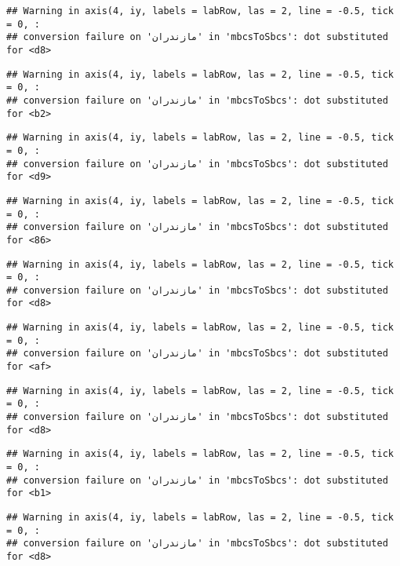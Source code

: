 \documentclass[
]{article}
\begin{document}
\begin{verbatim}
## Warning in axis(4, iy, labels = labRow, las = 2, line = -0.5, tick = 0, :
## conversion failure on 'مازندران' in 'mbcsToSbcs': dot substituted for <d8>
\end{verbatim}

\begin{verbatim}
## Warning in axis(4, iy, labels = labRow, las = 2, line = -0.5, tick = 0, :
## conversion failure on 'مازندران' in 'mbcsToSbcs': dot substituted for <b2>
\end{verbatim}

\begin{verbatim}
## Warning in axis(4, iy, labels = labRow, las = 2, line = -0.5, tick = 0, :
## conversion failure on 'مازندران' in 'mbcsToSbcs': dot substituted for <d9>
\end{verbatim}

\begin{verbatim}
## Warning in axis(4, iy, labels = labRow, las = 2, line = -0.5, tick = 0, :
## conversion failure on 'مازندران' in 'mbcsToSbcs': dot substituted for <86>
\end{verbatim}

\begin{verbatim}
## Warning in axis(4, iy, labels = labRow, las = 2, line = -0.5, tick = 0, :
## conversion failure on 'مازندران' in 'mbcsToSbcs': dot substituted for <d8>
\end{verbatim}

\begin{verbatim}
## Warning in axis(4, iy, labels = labRow, las = 2, line = -0.5, tick = 0, :
## conversion failure on 'مازندران' in 'mbcsToSbcs': dot substituted for <af>
\end{verbatim}

\begin{verbatim}
## Warning in axis(4, iy, labels = labRow, las = 2, line = -0.5, tick = 0, :
## conversion failure on 'مازندران' in 'mbcsToSbcs': dot substituted for <d8>
\end{verbatim}

\begin{verbatim}
## Warning in axis(4, iy, labels = labRow, las = 2, line = -0.5, tick = 0, :
## conversion failure on 'مازندران' in 'mbcsToSbcs': dot substituted for <b1>
\end{verbatim}

\begin{verbatim}
## Warning in axis(4, iy, labels = labRow, las = 2, line = -0.5, tick = 0, :
## conversion failure on 'مازندران' in 'mbcsToSbcs': dot substituted for <d8>
\end{verbatim}
\end{document}
